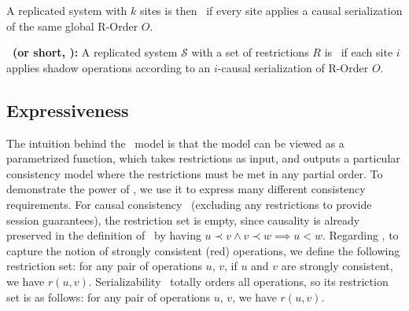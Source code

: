 A replicated system with $k$ sites is then \PRCAJ\ if every site applies a
causal serialization of the same global R-Order $O$.

\begin{mydef}
\textbf{\PRCNF\ (or short, \PRCN):} A replicated system $\mathscr{S}$ with a set of restrictions $R$ is \PRCAJ\ if 
each site $i$ applies shadow operations according to an $i$-causal serialization of R-Order $O$.
\label{def:porconsistency}
\end{mydef}


\subsection{Expressiveness} The intuition behind the \PRCN\ model is that the model can be viewed as a
parametrized function, which takes restrictions as input, and outputs
a particular consistency model where the restrictions must be met in any partial order.
To demonstrate the power of \PRCN,
we use it to express many different consistency requirements. 
For causal consistency~\cite{Lloyd2011Causal} (excluding any restrictions to provide session guarantees), 
the restriction set is empty, since causality is already preserved in the definition 
of \PRCN\ by having $u \prec v \wedge v \prec w \implies u < w$. 
Regarding \RBCN, to capture the notion of strongly consistent (red) operations, we define 
the following restriction set: for any pair of operations $u$, $v$, if $u$ and $v$ are strongly consistent, 
we have $r(u,v)$. Serializability~\cite{Bernstein1987CCR} totally orders all
operations, so its restriction set is as follows: for any pair of operations $u$, $v$, we have $r(u, v)$.
